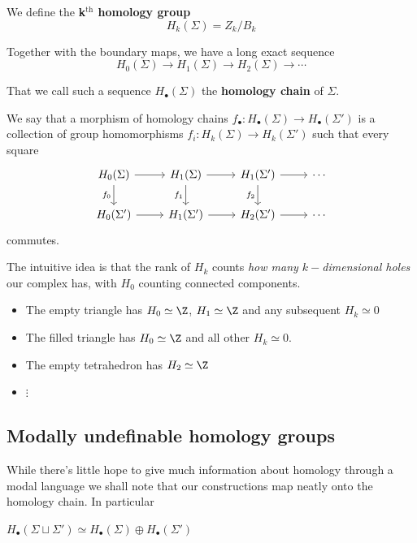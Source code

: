 \begin{definition}\hfill

We define the \textbf{k$^{\text{th}}$ homology group}
\[H_k(\Sigma)=Z_k/B_k\]
\end{definition}
\begin{definition}
    
Together with the boundary maps, we have a long exact sequence 
\[H_0(\Sigma)\to H_1(\Sigma)\to H_2(\Sigma)\to\cdots\]

That we call such a sequence $H_{\bullet}(\Sigma)$ the \textbf{homology chain} of $\Sigma$.

We say that a morphism of homology chains $f_\bullet:H_\bullet(\Sigma)\to H_\bullet(\Sigma')$ is a collection of
group homomorphisms $f_i:H_k(\Sigma)\to H_k(\Sigma')$ such that every square
\[\begin{tikzcd}[ampersand replacement=\&]
	{H_0(\Sigma)} \& {H_1(\Sigma)} \& {H_1(\Sigma')} \& \cdots \\
	{H_0(\Sigma')} \& {H_1(\Sigma')} \& {H_2(\Sigma')} \& \cdots
	\arrow[from=1-1, to=1-2]
	\arrow["{f_0}"', from=1-1, to=2-1]
	\arrow[from=1-2, to=1-3]
	\arrow["{f_1}"', from=1-2, to=2-2]
	\arrow[from=1-3, to=1-4]
	\arrow["{f_2}"', from=1-3, to=2-3]
	\arrow[from=2-1, to=2-2]
	\arrow[from=2-2, to=2-3]
	\arrow[from=2-3, to=2-4]
\end{tikzcd}\]
commutes.
\end{definition}

The intuitive idea is that the rank of $H_k$ counts \textit{how many $k-$dimensional holes} our complex has, with $H_0$ counting connected components.

\begin{example}\hfill 

    \begin{itemize}
        \item The empty triangle has $H_0\simeq \Z$, $H_1\simeq \Z$ and any subsequent $H_k\simeq 0$
        \item The filled triangle has $H_0\simeq \Z$ and all other $H_k\simeq 0$.
        \item The empty tetrahedron has $H_2\simeq \Z$
        \item $\vdots$
    \end{itemize}
\end{example}

\subsection{Modally undefinable homology groups}
While there's little hope to give much information about homology through a modal language we shall note that our constructions map neatly
onto the homology chain. 
In particular 
\begin{proposition}
$H_\bullet(\Sigma\sqcup\Sigma')\simeq H_\bullet(\Sigma)\oplus H_\bullet(\Sigma')$
\end{proposition}

